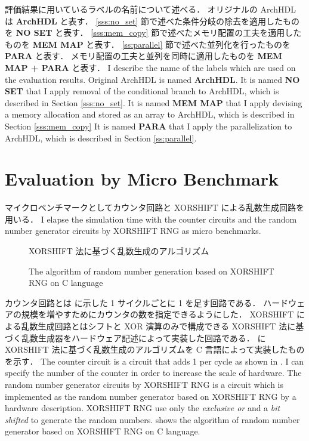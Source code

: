 評価結果に用いているラベルの名前について述べる．
オリジナルの ArchHDL は \textbf{ArchHDL} と表す．
\ref{sss:no_set} 節で述べた条件分岐の除去を適用したものを \textbf{NO SET} と表す．
\ref{sss:mem_copy} 節で述べたメモリ配置の工夫を適用したものを \textbf{MEM MAP} と表す．
\ref{ss:parallel} 節で述べた並列化を行ったものを \textbf{PARA} と表す．
メモリ配置の工夫と並列を同時に適用したものを \textbf{MEM MAP + PARA} と表す．
\fi
I describe the name of the labels which are used on the evaluation results.
Original ArchHDL is named \textbf{ArchHDL}.
It is named \textbf{NO SET} that I apply removal of the conditional branch to ArchHDL, which is described in Section \ref{sss:no_set}.
It is named \textbf{MEM MAP} that I apply devising a memory allocation and stored as an array to ArchHDL, which is described in Section \ref{sss:mem_copy}
It is named \textbf{PARA} that I apply the parallelization to ArchHDL, which is described in Section \ref{ss:parallel}.


\section{Evaluation by Micro Benchmark}

マイクロベンチマークとしてカウンタ回路と XORSHIFT による乱数生成回路を用いる．
\fi
I elapse the simulation time with the counter circuits and the random number generator circuits by XORSHIFT RNG as micro benchmarks.

\begin{figure}[tb]
 
 \caption{XORSHIFT 法に基づく乱数生成のアルゴリズム}
\fi
 \caption{The algorithm of random number generation based on XORSHIFT RNG on C language}
 \label{src:xorshift_alg}
\end{figure}

カウンタ回路とは  に示した 1 サイクルごとに 1 を足す回路である．
ハードウェアの規模を増やすためにカウンタの数を指定できるようにした．
XORSHIFT による乱数生成回路とはシフトと XOR 演算のみで構成できる XORSHIFT 法に基づく乱数生成器をハードウェア記述によって実装した回路である．
 に XORSHIFT 法に基づく乱数生成のアルゴリズムを C 言語によって実装したものを示す．
\fi
The counter circuit is a circuit that adds 1 per cycle as shown in .
I can specify the number of the counter in order to increase the scale of hardware.
The random number generator circuits by XORSHIFT RNG is a circuit which is implemented as the random number generator based on XORSHIFT RNG by a hardware description.
XORSHIFT RNG use only the \textit{exclusive or} and a \textit{bit shifted} to generate the random numbers.
 shows the algorithm of random number generator based on XORSHIFT RNG on C language.

